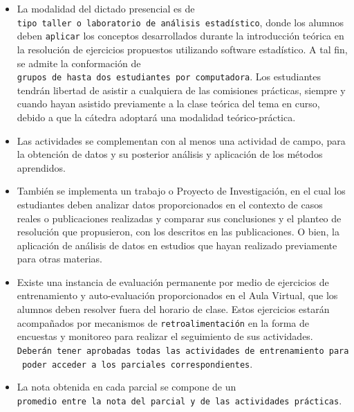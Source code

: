 \documentclass[
  spanish,
  letterpaper,
  DIV=11,
  numbers=noendperiod]{scrreprt}
\begin{document}
\begin{tcolorbox}[enhanced jigsaw, arc=.35mm, bottomrule=.15mm, bottomtitle=1mm, breakable, colback=white, colbacktitle=quarto-callout-note-color!10!white, colframe=quarto-callout-note-color-frame, coltitle=black, left=2mm, leftrule=.75mm, opacityback=0, opacitybacktitle=0.6, rightrule=.15mm, title=\textcolor{quarto-callout-note-color}{\faInfo}\hspace{0.5em}{Descripción de la cursada}, titlerule=0mm, toprule=.15mm, toptitle=1mm]

\begin{itemize}
\item
  La modalidad del dictado presencial es de
  \texttt{tipo\ taller\ o\ laboratorio\ de\ análisis\ estadístico},
  donde los alumnos deben \texttt{aplicar} los conceptos desarrollados
  durante la introducción teórica en la resolución de ejercicios
  propuestos utilizando software estadístico. A tal fin, se admite la
  conformación de
  \texttt{grupos\ de\ hasta\ dos\ estudiantes\ por\ computadora}. Los
  estudiantes tendrán libertad de asistir a cualquiera de las comisiones
  prácticas, siempre y cuando hayan asistido previamente a la clase
  teórica del tema en curso, debido a que la cátedra adoptará una
  modalidad teórico-práctica.
\item
  Las actividades se complementan con al menos una actividad de campo,
  para la obtención de datos y su posterior análisis y aplicación de los
  métodos aprendidos.
\item
  También se implementa un trabajo o Proyecto de Investigación, en el
  cual los estudiantes deben analizar datos proporcionados en el
  contexto de casos reales o publicaciones realizadas y comparar sus
  conclusiones y el planteo de resolución que propusieron, con los
  descritos en las publicaciones. O bien, la aplicación de análisis de
  datos en estudios que hayan realizado previamente para otras materias.
\item
  Existe una instancia de evaluación permanente por medio de ejercicios
  de entrenamiento y auto-evaluación proporcionados en el Aula Virtual,
  que los alumnos deben resolver fuera del horario de clase. Estos
  ejercicios estarán acompañados por mecanismos de
  \texttt{retroalimentación} en la forma de encuestas y monitoreo para
  realizar el seguimiento de sus actividades.
  \texttt{Deberán\ tener\ aprobadas\ todas\ las\ actividades\ de\ entrenamiento\ para\ poder\ acceder\ a\ los\ parciales\ correspondientes}.
\item
  La nota obtenida en cada parcial se compone de un
  \texttt{promedio\ entre\ la\ nota\ del\ parcial\ y\ de\ las\ actividades\ prácticas}.
\end{itemize}

\end{tcolorbox}
\end{document}
